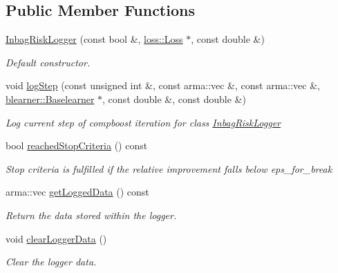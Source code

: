 \subsection*{Public Member Functions}
\begin{DoxyCompactItemize}
\item 
\mbox{\hyperlink{classlogger_1_1_inbag_risk_logger_aab67656c1530f20c29ffed3d54ef8fce}{Inbag\+Risk\+Logger}} (const bool \&, \mbox{\hyperlink{classloss_1_1_loss}{loss\+::\+Loss}} $\ast$, const double \&)
\begin{DoxyCompactList}\small\item\em Default constructor. \end{DoxyCompactList}\item 
void \mbox{\hyperlink{classlogger_1_1_inbag_risk_logger_ad90612e1b684287a29bdbde1077d65d7}{log\+Step}} (const unsigned int \&, const arma\+::vec \&, const arma\+::vec \&, \mbox{\hyperlink{classblearner_1_1_baselearner}{blearner\+::\+Baselearner}} $\ast$, const double \&, const double \&)
\begin{DoxyCompactList}\small\item\em Log current step of compboost iteration for class {\ttfamily \mbox{\hyperlink{classlogger_1_1_inbag_risk_logger}{Inbag\+Risk\+Logger}}} \end{DoxyCompactList}\item 
bool \mbox{\hyperlink{classlogger_1_1_inbag_risk_logger_a17a7416e4cc9db4da3b3eda5012ad7c7}{reached\+Stop\+Criteria}} () const
\begin{DoxyCompactList}\small\item\em Stop criteria is fulfilled if the relative improvement falls below {\ttfamily eps\+\_\+for\+\_\+break} \end{DoxyCompactList}\item 
arma\+::vec \mbox{\hyperlink{classlogger_1_1_inbag_risk_logger_af69f22c25521341a26152692bd03183a}{get\+Logged\+Data}} () const
\begin{DoxyCompactList}\small\item\em Return the data stored within the logger. \end{DoxyCompactList}\item 
void \mbox{\hyperlink{classlogger_1_1_inbag_risk_logger_aecdde2764203ec24ca360846538ce3c6}{clear\+Logger\+Data}} ()
\begin{DoxyCompactList}\small\item\em Clear the logger data. \end{DoxyCompactList}\item 

\end{DoxyCompactItemize}
